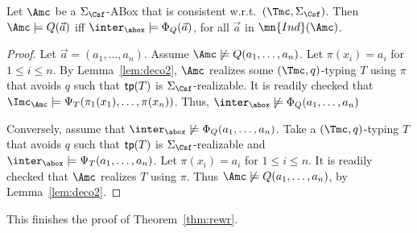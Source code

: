 \documentclass{lmcs}
\theoremstyle{definition}
\newtheorem{claim}{Claim}
\let\OriginalQedSymbol\qedsymbol
\renewcommand{\qedsymbol}{\OriginalQedSymbol\setcounter{claim}{0}}
\let\NormalQedSymbol\qedsymbol
\newenvironment{clmproof}[1]{\renewcommand{\qedsymbol}{$\dashv$}\begin{proof}[Proof of claim.]\space#1}{\end{proof}\renewcommand{\qedsymbol}{\NormalQedSymbol}}
\begin{document}
\begin{prop}\label{prop:fo}
  Let $\Amc$ be a $\Sigma_{\Csf}$-ABox that is consistent 
  w.r.t.~$(\Tmc,\Sigma_{\Csf})$. Then $\Amc \models Q(\vec{a})$ iff 
  $\inter_\abox \models \Phi_{Q}(\vec{a})$, for all $\vec{a}$ in $\mn{Ind}(\Amc)$.
\end{prop}
\begin{proof}
  Let $\vec{a}=(a_{1},\ldots,a_{n})$. Assume $\Amc \not\models Q(a_{1},\ldots,a_{n})$. Let 
  $\pi(x_{i})=a_{i}$ for $1\leq i \leq n$. By Lemma~\ref{lem:deco2}, 
  $\Amc$ realizes some $(\Tmc,q)$-typing $T$ using $\pi$ that avoids $q$ 
  such that ${\sf tp}(T)$ is $\Sigma_{\Csf}$-realizable. It is readily checked 
  that $\Imc_{\Amc}\models \Psi_{T}(\pi_{1}(x_{1}),\ldots,\pi(x_{n}))$.  
  Thus, $\inter_\abox \not\models \Phi_{Q}(a_{1},\ldots,a_{n})$

  Conversely, assume that $\inter_\abox \not\models
  \Phi_{Q}(a_{1},\ldots,a_{n})$.  Take a $(\Tmc,q)$-typing $T$ that avoids $q$ such that ${\sf
    tp}(T)$ is $\Sigma_{\Csf}$-realizable and $\inter_\abox \models
  \Psi_{T}(a_{1},\ldots,a_{n})$. Let $\pi(x_{i})=a_{i}$ for $1\leq i 
  \leq n$.  It is readily checked that $\Amc$ realizes $T$ using $\pi$. 
  Thus $\Amc \not\models Q(a_{1},\ldots,a_{n})$, by 
  Lemma~\ref{lem:deco2}.
\end{proof}
This finishes the proof of Theorem~\ref{thm:rewr}.

\end{document}
